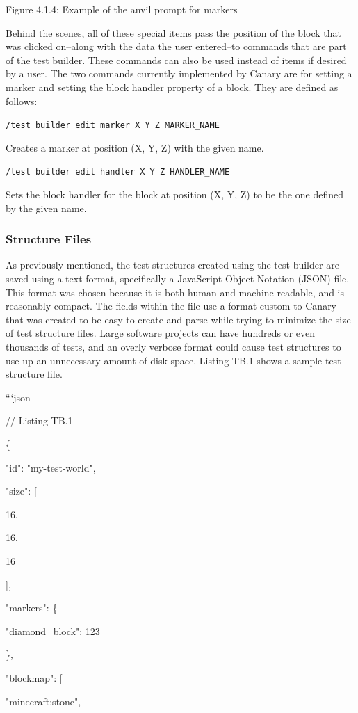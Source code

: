 \documentclass{article}
\def\code#1{\texttt{#1}}
\begin{document}
\begin{onehalfspacing}
Figure 4.1.4: Example of the anvil prompt for markers

Behind the scenes, all of these special items pass the position of the
block that was clicked on--along with the data the user entered--to
commands that are part of the test builder. These commands can also be
used instead of items if desired by a user. The two commands currently
implemented by Canary are for setting a marker and setting the block
handler property of a block. They are defined as follows:

\code{/test builder edit marker X Y Z MARKER\_NAME}

Creates a marker at position (X, Y, Z) with the given name.

\code{/test builder edit handler X Y Z HANDLER\_NAME}

Sets the block handler for the block at position (X, Y, Z) to be the one
defined by the given name.

\subsubsection{Structure Files}

As previously mentioned, the test structures created using the test
builder are saved using a text format, specifically a JavaScript Object
Notation (JSON) file. This format was chosen because it is both human
and machine readable, and is reasonably compact. The fields within the
file use a format custom to Canary that was created to be easy to create
and parse while trying to minimize the size of test structure files.
Large software projects can have hundreds or even thousands of tests,
and an overly verbose format could cause test structures to use up an
unnecessary amount of disk space. Listing TB.1 shows a sample test
structure file.

```json

// Listing TB.1

\{

"id": "my-test-world",

"size": {[}

16,

16,

16

{]},

"markers": \{

"diamond\_block": 123

\},

"blockmap": {[}

"minecraft:stone",


\end{onehalfspacing}
\end{document}
